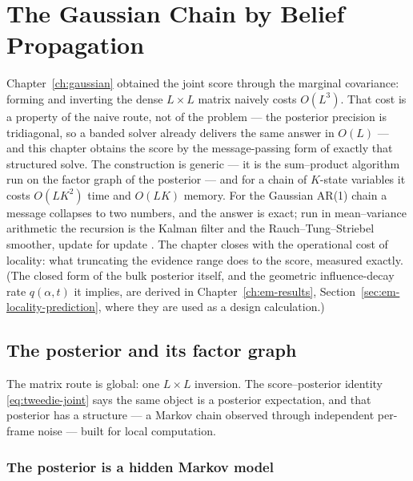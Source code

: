 \chapter{The Gaussian Chain by Belief Propagation}\label{ch:gaussian-bp}

Chapter~\ref{ch:gaussian} obtained the joint score through the marginal
covariance: forming and inverting the dense $L \times L$ matrix naively costs
$O(L^3)$. That cost is a property of the naive route, not of the problem ---
the posterior precision is tridiagonal, so a banded solver already delivers
the same answer in $O(L)$ --- and this chapter obtains the score by the
message-passing form of exactly that structured solve. The construction is
generic --- it is the sum--product algorithm run on the factor
graph of the posterior --- and for a chain of $K$-state variables it costs
$O(LK^2)$ time and $O(LK)$ memory. For the Gaussian AR(1) chain a message
collapses to two numbers, and the answer is exact; run in
mean--variance arithmetic the recursion is the Kalman filter and the
Rauch--Tung--Striebel smoother, update for update
\citep{kalman1960new, rauch1965maximum}. The chapter closes with the
operational cost of locality: what truncating the evidence range does to the
score, measured exactly. (The closed form of the bulk posterior itself, and
the geometric influence-decay rate $q(\alpha,t)$ it implies, are derived in
Chapter~\ref{ch:em-results}, Section~\ref{sec:em-locality-prediction}, where
they are used as a design calculation.)

\section{The posterior and its factor graph}
\label{sec:bp-chain}\label{sec:bp-problem}

The matrix route is global: one $L \times L$ inversion. The score--posterior
identity \eqref{eq:tweedie-joint} says the same object is a posterior
expectation, and that posterior has a structure --- a Markov chain observed
through independent per-frame noise --- built for local computation.

\subsection{The posterior is a hidden Markov model}

